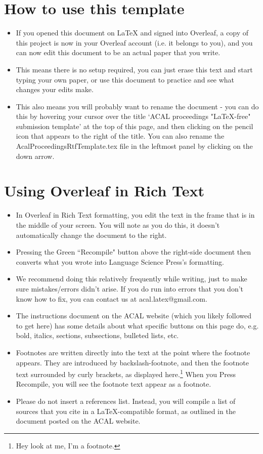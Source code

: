 \documentclass[output=paper,colorlinks,citecolor=brown,
]{langscibook}
\begin{document}
\section{How to use this template}
\begin{itemize}

\item If you opened this document on LaTeX and signed into Overleaf, a copy of this project is now in your Overleaf account (i.e. it belongs to you), and you can now edit this document to be an actual paper that you write. 
\item This means there is no setup required, you can just erase this text and start typing your own paper, or use this document to practice and see what changes your edits make.
\item This also means you will probably want to rename the document - you can do this by hovering your cursor over the title `ACAL proceedings "LaTeX-free" submission template' at the top of this page, and then clicking on the pencil icon that appears to the right of the title. You can also rename the AcalProceedingsRtfTemplate.tex file in the leftmost panel by clicking on the down arrow.
\end{itemize}

\section{Using Overleaf in Rich Text}
\begin{itemize}

\item In Overleaf in Rich Text formatting, you edit the text in the frame that is in the middle of your screen. You will note as you do this, it doesn't automatically change the  document to the right.
\item Pressing the Green ``Recompile" button above the right-side document then converts what you wrote into Language Science Press's formatting. 
\item We recommend doing this relatively frequently while writing, just to make sure mistakes/errors didn't arise. If you do run into errors that you don't know how to fix, you can contact us at acal.latex@gmail.com. 
\item The instructions document on the ACAL website (which you likely followed to get here) has some details about what specific buttons on this page do, e.g. bold, italics, sections, subsections, bulleted lists, etc.
\item Footnotes are written directly into the text at the point where the footnote appears. They are introduced by backslash-footnote, and then the footnote text surrounded by curly brackets, as displayed here.\footnote{Hey look at me, I'm a footnote.} When you Press Recompile, you will see the footnote text appear as a footnote.
\item Please do not insert a references list. Instead, you will compile a list of sources that you cite in a LaTeX-compatible format, as outlined in the document posted on the ACAL website.
\end{itemize}
\end{document}
